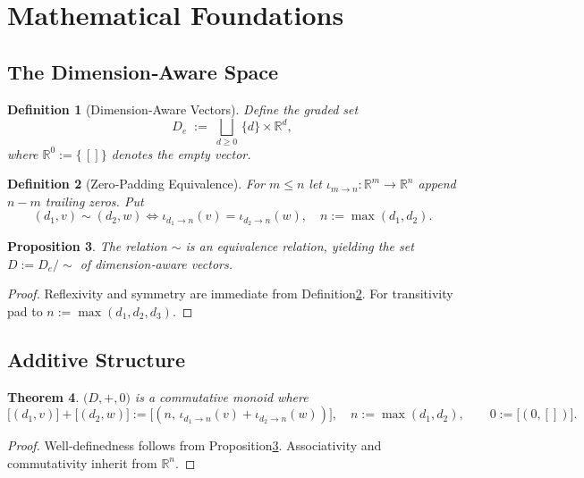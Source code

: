 \documentclass[11pt]{article}
\newtheorem{theorem}{Theorem}[section]
\newtheorem{proposition}[theorem]{Proposition}
\newtheorem{definition}[theorem]{Definition}
\begin{document}
\section{Mathematical Foundations}
\label{sec:foundations}
\subsection{The Dimension‑Aware Space}
\begin{definition}[Dimension‑Aware Vectors]\label{def:DAspace}
Define the graded set
\[
  D_e\;:=\;\bigsqcup_{d\ge0}\,\{d\}\times\mathbb R^{d},
\]
where \(\mathbb R^{0}:=\{\,[]\}\) denotes the empty vector.
\end{definition}

\begin{definition}[Zero‑Padding Equivalence]\label{def:padding}
For \(m\le n\) let \(\iota_{m\rightarrow n}\colon\mathbb R^{m}\to\mathbb R^{n}\) append \(n-m\) trailing zeros.  Put
\[
  (d_1,v)\sim(d_2,w)
  \iff \iota_{d_1\rightarrow n}(v)=\iota_{d_2\rightarrow n}(w),\quad n:=\max(d_1,d_2).
\]
\end{definition}

\begin{proposition}\label{prop:equiv}
The relation \(\sim\) is an equivalence relation, yielding the set \(D:=D_e/\!\sim\) of \emph{dimension‑aware vectors}.
\end{proposition}
\begin{proof}
Reflexivity and symmetry are immediate from Definition\;\ref{def:padding}.  For transitivity pad to \(n:=\max(d_1,d_2,d_3)\).\end{proof}

\subsection{Additive Structure}
\begin{theorem}\label{thm:add}
\(\bigl(D,+,0\bigr)\) is a commutative monoid where
\[
  \bigl[(d_1,v)\bigr]+\bigl[(d_2,w)\bigr]
  :=\bigl[(n,\,\iota_{d_1\rightarrow n}(v)+\iota_{d_2\rightarrow n}(w))\bigr],
  \quad n:=\max(d_1,d_2),\qquad
  0:=\bigl[(0,[])\bigr].
\]
\end{theorem}
\begin{proof}
Well‑definedness follows from Proposition\;\ref{prop:equiv}. Associativity and commutativity inherit from \(\mathbb R^n\).\end{proof}
\end{document}
